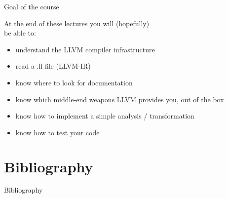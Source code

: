 \documentclass[10pt,mathserif]{beamer}
\begin{document}
\begin{frame}[t]{Goal of the course}
	\begin{center}
	\begin{varwidth}{8.5cm}
  At the end of these lectures you will (hopefully)\\ be able to:
  \medskip
  \begin{itemize}
    \item understand the LLVM compiler infrastructure
    \item read a .ll file (LLVM-IR)
    \item know where to look for documentation
    \item know which middle-end weapons
          LLVM provides you, out of the box
    \item know how to implement a simple analysis / transformation
    \item know how to test your code
  \end{itemize}
  \end{varwidth}
  \end{center}
\end{frame}

\section*{Bibliography}
\begin{frame}[allowframebreaks]{Bibliography}
\nocite{*}


\end{frame}
\end{document}
